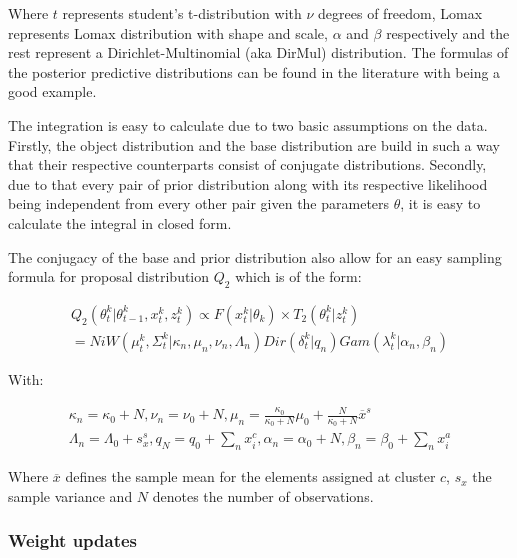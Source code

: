 \documentclass [twoside,hidelinks]{article}
\begin{document}
Where $t$ represents student's t-distribution with $\nu$ degrees of freedom, Lomax represents Lomax distribution with shape and scale, $\alpha$ and $\beta$ respectively and the rest represent a Dirichlet-Multinomial (aka DirMul) distribution. The formulas of the posterior predictive distributions can be found in the literature with \cite{compendium} being a good example. 

The integration is easy to calculate due to two basic assumptions on the data. Firstly, the object distribution and the base distribution are build in such a way that their respective counterparts consist of conjugate distributions. Secondly, due to that every pair of prior distribution along with its respective likelihood being independent from every other pair given the parameters $\theta$, it is easy to calculate the integral in closed form.

The conjugacy of the base and prior distribution also allow for an easy sampling formula for proposal distribution $Q_2$ which is of the form: 

\begin{equation} \label{Q_2}
\begin{split}
Q_2 (\theta_t^k | \theta_{t-1}^k , x_t^k, z_t^k) \propto F ( x_t^k | \theta_k) \times T_2 (\theta_t^k | z_t^k) \\
= NiW ( \mu_t^k, \Sigma_t^k | \kappa_n, \mu_n, \nu_n, \Lambda_n ) Dir (\delta_t^k | q_n) Gam (\lambda_t^k | \alpha_n, \beta_n)
\end{split}
\end{equation}

With:

\begin{equation} \label{udpates}
\begin{split}
\kappa_n = \kappa_0 + N ,
\nu_n = \nu_0 + N ,
\mu_n = \frac{\kappa_0}{\kappa_0 + N} \mu_0 +  \frac{N}{\kappa_0 + N} \overline{x}^s\\
\Lambda_n = \Lambda_0 + s_{x}^s,
q_N = q_0 +  \sum_n x_i^c,
\alpha_n = \alpha_0 +  N,
\beta_n = \beta_0 +  \sum_n x_i^a
\end{split}
\end{equation}


Where $\overline{x}$ defines the sample mean for the elements assigned at cluster $c$, $s_{x}$ the sample variance and $N$ denotes the number of observations\cite{conjugate}.

\subsubsection{Weight updates}
\end{document}
